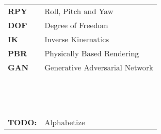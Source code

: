 \begin{table}[!hb]
\begin{tabular}{ll}
        \textbf{RPY}   & Roll, Pitch and Yaw                                        \\
        \textbf{DOF}   & Degree of Freedom                                          \\
        \textbf{IK}    & Inverse Kinematics                                         \\
        \textbf{PBR}   & Physically Based Rendering                                 \\
        \textbf{GAN}   & Generative Adversarial Network                             \\
        \textbf{}      &                                                            \\
        \textbf{}      &                                                            \\
        \textbf{}      &                                                            \\
        \textbf{}      &                                                            \\
        \textbf{}      &                                                            \\
        \textbf{}      &                                                            \\
        \textbf{}      &                                                            \\
        \textbf{}      &                                                            \\
        \textbf{}      &                                                            \\
        \textbf{}      &                                                            \\
        \textbf{}      &                                                            \\
        \textbf{}      &                                                            \\
        \textbf{}      &                                                            \\
        \textbf{}      &                                                            \\
        \textbf{TODO:} & Alphabetize                                                \\
    \end{tabular}
\end{table}
\capstarttrue

